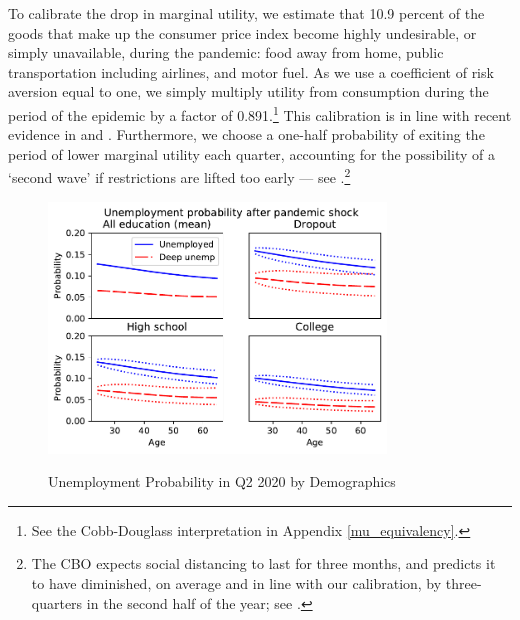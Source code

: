\documentclass[titlepage,letterpaper]{\econtex}
\begin{document}
To calibrate the drop in marginal utility, we estimate that 10.9 percent of the goods that make up the consumer price index become highly undesirable, or simply unavailable, during the pandemic: food away from home, public transportation including airlines, and motor fuel.
As we use a coefficient of risk aversion equal to one, we simply multiply utility from consumption during the period of the epidemic by a factor of 0.891.\footnote{See the Cobb-Douglass interpretation in Appendix \ref{mu_equivalency}.} 
This calibration is in line with recent evidence in \cite{covidC_chase} and \cite{chetty_covidC}.
Furthermore, we choose a one-half probability of exiting the period of lower marginal utility each quarter, accounting for the possibility of a `second wave' if restrictions are lifted too early --- see \cite{cyranoski_we_2020}.\footnote{The CBO expects social distancing to last for three months, and predicts it to have diminished, on average and in line with our calibration, by three-quarters in the second half of the year; see \cite{SwagelCBO2020}.}

\hypertarget{unemployment-demographics}{}
\begin{figure}
  \centering
  \caption{Unemployment Probability in Q2 2020 by Demographics}
  \label{unemployment_demographics}
  { \includegraphics[width=0.8\textwidth]{./Figures/UnempProbByDemogBasic}}
\end{figure}
\end{document}
